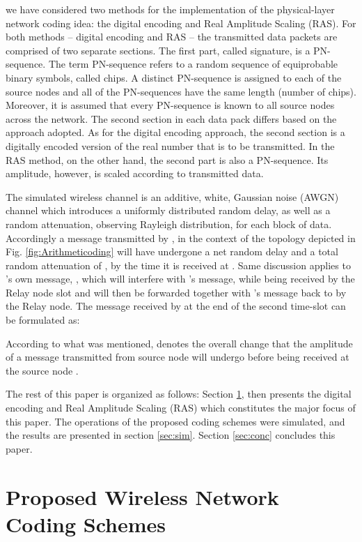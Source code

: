 \documentclass[conference]{IEEEtran}
\begin{document}
we have considered two methods for the implementation of the physical-layer network coding idea: the digital encoding and Real Amplitude Scaling (RAS). For both methods -- digital encoding and RAS -- the transmitted data packets are comprised of two separate sections. The first part, called signature, is a PN-sequence. The term PN-sequence refers to a random sequence of equiprobable binary symbols, called chips. A distinct PN-sequence is assigned to each of the source nodes and all of the PN-sequences have the same length (number of chips). Moreover, it is assumed that every PN-sequence is known to all source nodes across the network. The second section in each data pack differs based on the approach adopted. As for the digital encoding approach, the second section is a digitally encoded version of the real number that is to be transmitted. In the RAS method, on the other hand, the second part is also a PN-sequence. Its amplitude, however, is scaled according to transmitted data.

The simulated wireless channel is an additive, white, Gaussian noise (AWGN) channel which introduces a uniformly distributed random delay, as well as a random attenuation, observing Rayleigh distribution, for each block of data. Accordingly a message  transmitted by , in the context of the topology depicted in Fig. \ref{fig:Arithmeticoding} will have undergone a net random delay  and a total random attenuation of , by the time it is received at . Same discussion applies to 's own message, , which will interfere with 's message, while being received by the Relay node slot and will then be forwarded together with 's message back to  by the Relay node. The message received by  at the end of the second time-slot can be formulated as:



According to what was mentioned,  denotes the overall change that the amplitude of a message transmitted from source node  will undergo before being received at the source node .

The rest of this paper is organized as follows: Section \ref{proposed}, then presents the digital encoding and Real Amplitude Scaling (RAS) which constitutes the major focus of this paper. The operations of the proposed coding schemes were simulated, and the results are presented in section \ref{sec:sim}. Section \ref{sec:conc} concludes this paper. 
\section{Proposed Wireless Network Coding Schemes}\label{proposed}
\end{document}
